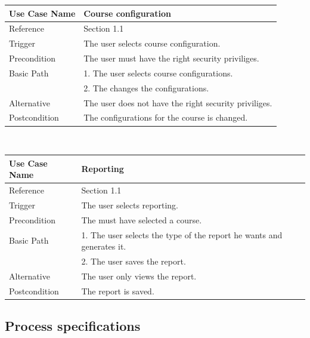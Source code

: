 \documentclass[10pt,a4paper]{article}
\begin{document}
                \begin{tabular}{|l|l|}\hline
                        Use Case Name   & Course configuration \\\hline
                        Reference & Section 1.1\\\hline
                        Trigger & The user selects course configuration.\\\hline
                        Precondition & The user must have the right security priviliges.\\\hline
                        Basic Path & 1.	The user selects course configurations. \\\linebreak &
                        2.	 The changes the configurations.\\\hline
                        Alternative & The user does not have the right security priviliges.\\\hline
                        Postcondition & The configurations for the course is changed.\\\hline
                \end{tabular}\\\linebreak
                
                \begin{tabular}{|l|l|}\hline
                        Use Case Name   & Reporting \\\hline
                        Reference & Section 1.1\\\hline
                        Trigger & The user selects reporting.\\\hline
                        Precondition & The must have selected a course.\\\hline
                        Basic Path & 1.	The user selects the type of the report he wants and generates it. 
                        \\\linebreak &2.	 The user saves the report.\\\hline
                        Alternative & The user only views the report.\\\hline
                        Postcondition & The report is saved.\\\hline
                \end{tabular}
                
               
\pagebreak
\subsection{Process specifications}
\end{document}

